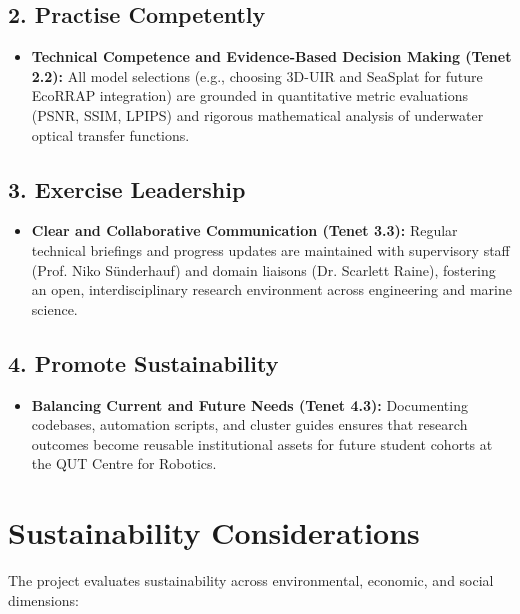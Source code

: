 \subsection{2. Practise Competently}
\begin{itemize}
    \item \textbf{Technical Competence and Evidence-Based Decision Making (Tenet 2.2):} All model selections (e.g., choosing 3D-UIR and SeaSplat for future EcoRRAP integration) are grounded in quantitative metric evaluations (PSNR, SSIM, LPIPS) and rigorous mathematical analysis of underwater optical transfer functions.
\end{itemize}

\subsection{3. Exercise Leadership}
\begin{itemize}
    \item \textbf{Clear and Collaborative Communication (Tenet 3.3):} Regular technical briefings and progress updates are maintained with supervisory staff (Prof. Niko S{\"u}nderhauf) and domain liaisons (Dr. Scarlett Raine), fostering an open, interdisciplinary research environment across engineering and marine science.
\end{itemize}

\subsection{4. Promote Sustainability}
\begin{itemize}
    \item \textbf{Balancing Current and Future Needs (Tenet 4.3):} Documenting codebases, automation scripts, and cluster guides ensures that research outcomes become reusable institutional assets for future student cohorts at the QUT Centre for Robotics.
\end{itemize}

\section{Sustainability Considerations}
\label{sec:sustainability}
The project evaluates sustainability across environmental, economic, and social dimensions:


